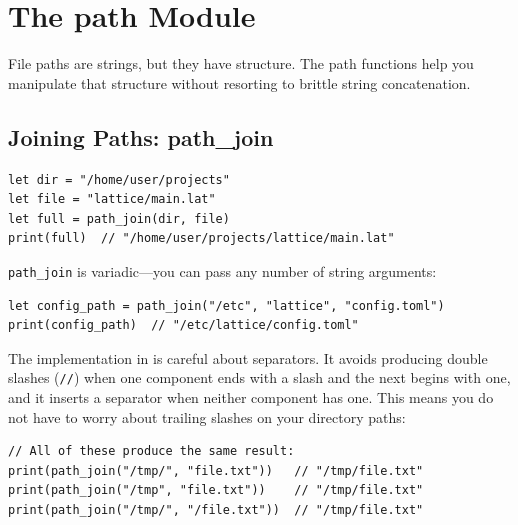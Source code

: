 \section{The path Module}\label{sec:path-module}


File paths are strings, but they have structure. The path functions help you
manipulate that structure without resorting to brittle string concatenation.

\subsection{Joining Paths: path\_join}\label{sec:path-join}

\begin{lstlisting}[language=Lattice, caption={Joining path components}]
let dir = "/home/user/projects"
let file = "lattice/main.lat"
let full = path_join(dir, file)
print(full)  // "/home/user/projects/lattice/main.lat"
\end{lstlisting}

\lstinline|path_join| is variadic---you can pass any number of string
arguments:

\begin{lstlisting}[language=Lattice, caption={Joining multiple path segments}]
let config_path = path_join("/etc", "lattice", "config.toml")
print(config_path)  // "/etc/lattice/config.toml"
\end{lstlisting}

The implementation in  is careful about separators.
It avoids producing double slashes (\texttt{//}) when one component ends with
a slash and the next begins with one, and it inserts a separator when neither
component has one. This means you do not have to worry about trailing slashes
on your directory paths:

\begin{lstlisting}[language=Lattice, caption={path\_join handles trailing slashes}]
// All of these produce the same result:
print(path_join("/tmp/", "file.txt"))   // "/tmp/file.txt"
print(path_join("/tmp", "file.txt"))    // "/tmp/file.txt"
print(path_join("/tmp/", "/file.txt"))  // "/tmp/file.txt"
\end{lstlisting}

